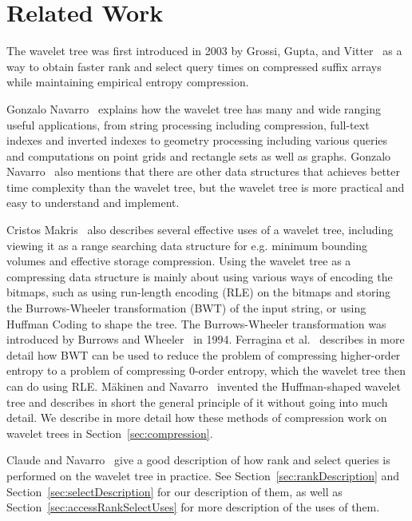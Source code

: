\section{Related Work}
The wavelet tree was first introduced in 2003 by Grossi, Gupta, and Vitter~ as a way to obtain faster rank and select query times on compressed suffix arrays while maintaining empirical entropy compression.

Gonzalo Navarro~ explains how the wavelet tree has many and wide ranging useful applications, from string processing including compression, full-text indexes and inverted indexes to geometry processing including various queries and computations on point grids and rectangle sets as well as graphs. 
Gonzalo Navarro~ also mentions that there are other data structures that achieves better time complexity than the wavelet tree, but the wavelet tree is more practical and easy to understand and implement.

Cristos Makris~ also describes several effective uses of a wavelet tree, including viewing it as a range searching data structure for e.g. minimum bounding volumes and effective storage compression.
Using the wavelet tree as a compressing data structure is mainly about using various ways of encoding the bitmaps, such as using run-length encoding (RLE) on the bitmaps and storing the Burrows-Wheeler transformation (BWT) of the input string, or using Huffman Coding to shape the tree.
The Burrows-Wheeler transformation was introduced by Burrows and Wheeler~ in 1994.
Ferragina et al.~ describes in more detail how BWT can be used to reduce the problem of compressing higher-order entropy to a problem of compressing 0-order entropy, which the wavelet tree then can do using RLE.
Mäkinen and Navarro~ invented the Huffman-shaped wavelet tree and describes in short the general principle of it without going into much detail.
We describe in more detail how these methods of compression work on wavelet trees in Section~\ref{sec:compression}.

Claude and Navarro~ give a good description of how rank and select queries is performed on the wavelet tree in practice.
See Section~\ref{sec:rankDescription} and Section~\ref{sec:selectDescription} for our description of them, as well as Section~\ref{sec:accessRankSelectUses} for more description of the uses of them.

